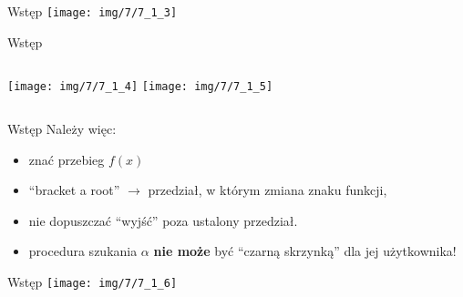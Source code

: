 \begin{frame}{Wstęp}
	\centering \texttt{[image: img/7/7\_1\_3]}
\end{frame}
\begin{frame}{Wstęp}
	\begin{columns}
		\centering   \texttt{[image: img/7/7\_1\_4]}
		\centering   \texttt{[image: img/7/7\_1\_5]}
	\end{columns}
\end{frame}
\begin{frame}{Wstęp}
	Należy więc:
	\begin{itemize}
		\item znać przebieg $f(x)$
		\item ``bracket a root''\newline
			  $\rightarrow$ przedział, w którym zmiana znaku funkcji,
		\item nie dopuszczać ``wyjść'' poza ustalony przedział.
		\item procedura szukania $\alpha$ {\bf nie może} być ``czarną skrzynką'' dla jej użytkownika!
	\end{itemize}
\end{frame}
\begin{frame}{Wstęp}
	\centering   \texttt{[image: img/7/7\_1\_6]}
\end{frame}